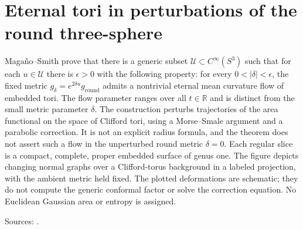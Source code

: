 \chapter{Eternal tori in perturbations of the round three-sphere}\label{sec:catalogue-perturbed-sphere-eternal-tori}
\begin{example}\label{ex:catalogue-perturbed-sphere-eternal-tori}
Maga\~no--Smith prove that there is a generic subset $\mathcal U\subset C^\infty(S^3)$ such that for each $u\in\mathcal U$ there is $\epsilon>0$ with the following property: for every $0<|\delta|<\epsilon$, the fixed metric $g_\delta=e^{2\delta u}g_{\mathrm{round}}$ admits a nontrivial eternal mean curvature flow of embedded tori. The flow parameter ranges over all $t\in\mathbb R$ and is distinct from the small metric parameter $\delta$.
The construction perturbs trajectories of the area functional on the space of Clifford tori, using a Morse--Smale argument and a parabolic correction. It is not an explicit radius formula, and the theorem does not assert such a flow in the unperturbed round metric $\delta=0$. Each regular slice is a compact, complete, proper embedded surface of genus one. The figure depicts changing normal graphs over a Clifford-torus background in a labeled projection, with the ambient metric held fixed. The plotted deformations are schematic; they do not compute the generic conformal factor or solve the correction equation. No Euclidean Gaussian area or entropy is assigned.
\par Sources: \cite{CatMaganoSmith2020}.
\end{example}


